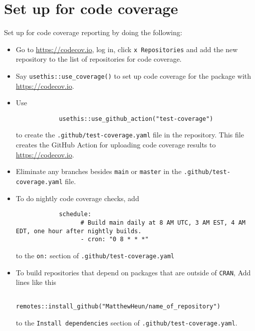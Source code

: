 \documentclass{article}
\begin{document}
\section{Set up for code coverage}
\label{sec:codecov_setup}

Set up for code coverage reporting by doing the following:
%
\begin{itemize}

  \item Go to \url{https://codecov.io}, log in, click \verb|x Repositories| and add 
  		the new repository to the list of repositories for code coverage.
  
  \item Say \verb|usethis::use_coverage()| to set up code coverage 
		for the package with \url{https://codecov.io}.
  
  \item Use 
  		\begin{verbatim}
			usethis::use_github_action("test-coverage")
		\end{verbatim}
		to create the \verb|.github/test-coverage.yaml| file in the repository. 
		This file creates the GitHub Action for 
		uploading code coverage results to \url{https://codecov.io}.
		
  \item Eliminate any branches besides \texttt{main} or \texttt{master}
  		in the \verb|.github/test-coverage.yaml| file.
		
  \item To do nightly code coverage checks, add
  		\begin{verbatim}
			schedule:
				  # Build main daily at 8 AM UTC, 3 AM EST, 4 AM EDT, one hour after nightly builds.
				  - cron: "0 8 * * *"
  		\end{verbatim}
		to the \texttt{on:} section of \verb|.github/test-coverage.yaml|
		
  \item To build repositories that depend on packages that are outside of \texttt{CRAN}, 
		Add lines like this
	        \begin{verbatim}
				remotes::install_github("MatthewHeun/name_of_repository")
			\end{verbatim}
		to the \texttt{Install dependencies} section of
		\texttt{.github/test-coverage.yaml}.
		
\end{itemize}
\end{document}

